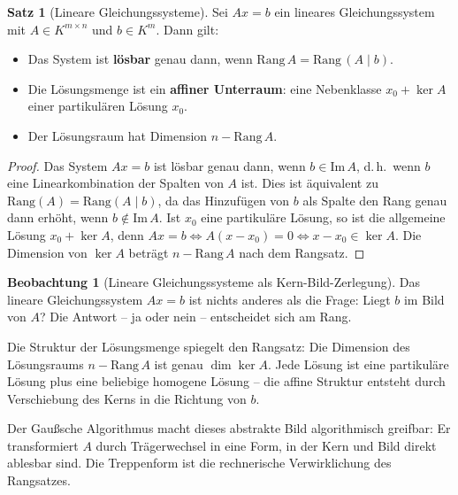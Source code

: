 ﻿\documentclass[a4paper,12pt]{report}
\theoremstyle{definition}
\newtheorem{satz}{Satz}
\newtheorem{beobachtung}{Beobachtung}
\begin{document}
\begin{satz}[Lineare Gleichungssysteme]
    Sei $Ax = b$ ein lineares Gleichungssystem mit $A \in K^{m \times n}$
    und $b \in K^m$. Dann gilt:
    \begin{itemize}
        \item[-] Das System ist \textbf{lösbar} genau dann, wenn
              $\mathrm{Rang}\, A = \mathrm{Rang}\,(A \mid b)$.
        \item[-] Die Lösungsmenge ist ein \textbf{affiner Unterraum}: eine
              Nebenklasse $x_0 + \ker A$ einer partikulären Lösung $x_0$.
        \item[-] Der Lösungsraum hat Dimension $n - \mathrm{Rang}\, A$.
    \end{itemize}
\end{satz}
\begin{proof}
    Das System $Ax = b$ ist lösbar genau dann, wenn $b \in \mathrm{Im}\, A$,
    d.\,h.\ wenn $b$ eine Linearkombination der Spalten von $A$ ist.
    Dies ist äquivalent zu $\mathrm{Rang}(A) = \mathrm{Rang}(A \mid b)$,
    da das Hinzufügen von $b$ als Spalte den Rang genau dann erhöht,
    wenn $b \notin \mathrm{Im}\, A$.
    Ist $x_0$ eine partikuläre Lösung, so ist die allgemeine Lösung
    $x_0 + \ker A$, denn $Ax = b \Leftrightarrow A(x - x_0) = 0
    \Leftrightarrow x - x_0 \in \ker A$.
    Die Dimension von $\ker A$ beträgt $n - \mathrm{Rang}\, A$ nach dem Rangsatz.
\end{proof}


\begin{beobachtung}[Lineare Gleichungssysteme als Kern-Bild-Zerlegung]
    Das lineare Gleichungssystem $Ax = b$ ist nichts anderes als die
    Frage: Liegt $b$ im Bild von $A$? Die Antwort -- ja oder nein --
    entscheidet sich am Rang.

    Die Struktur der Lösungsmenge spiegelt den Rangsatz: Die
    Dimension des Lösungsraums $n - \mathrm{Rang}\, A$ ist genau
    $\dim \ker A$. Jede Lösung ist eine partikuläre Lösung plus
    eine beliebige homogene Lösung -- die affine Struktur entsteht
    durch Verschiebung des Kerns in die Richtung von $b$.

    Der Gaußsche Algorithmus macht dieses abstrakte Bild algorithmisch
    greifbar: Er transformiert $A$ durch Trägerwechsel in eine Form, in der
    Kern und Bild direkt ablesbar sind. Die Treppenform ist die
    rechnerische Verwirklichung des Rangsatzes.
\end{beobachtung}

\end{document}
